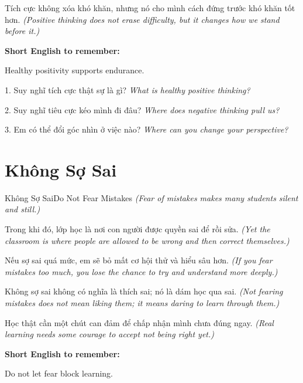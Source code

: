 \begin{baihoc}
Tích cực không xóa khó khăn, nhưng nó cho mình cách đứng trước khó khăn tốt hơn.
\textit{(Positive thinking does not erase difficulty, but it changes how we stand before it.)}
\end{baihoc}

\begin{ghinhoanh}
\textbf{Short English to remember:}

Healthy positivity supports endurance.

\end{ghinhoanh}

\begin{tuhocnhanh}
1. Suy nghĩ tích cực thật sự là gì? \textit{What is healthy positive thinking?}

2. Suy nghĩ tiêu cực kéo mình đi đâu? \textit{Where does negative thinking pull us?}

3. Em có thể đổi góc nhìn ở việc nào? \textit{Where can you change your perspective?}
\end{tuhocnhanh}
\ngancach

\section{Không Sợ Sai}
\begin{truyen}{Không Sợ Sai}{Do Not Fear Mistakes}
\textit{(Fear of mistakes makes many students silent and still.)}

Trong khi đó, lớp học là nơi con người được quyền sai để rồi sửa.
\textit{(Yet the classroom is where people are allowed to be wrong and then correct themselves.)}

Nếu sợ sai quá mức, em sẽ bỏ mất cơ hội thử và hiểu sâu hơn.
\textit{(If you fear mistakes too much, you lose the chance to try and understand more deeply.)}

Không sợ sai không có nghĩa là thích sai; nó là dám học qua sai.
\textit{(Not fearing mistakes does not mean liking them; it means daring to learn through them.)}
\end{truyen}

\begin{baihoc}
Học thật cần một chút can đảm để chấp nhận mình chưa đúng ngay.
\textit{(Real learning needs some courage to accept not being right yet.)}
\end{baihoc}

\begin{ghinhoanh}
\textbf{Short English to remember:}

Do not let fear block learning.

\end{ghinhoanh}

